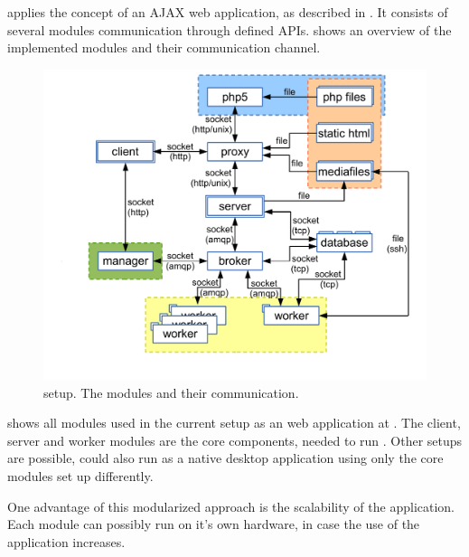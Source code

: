 

\spl applies the concept of an AJAX web application, as described in .
It consists of several modules communication through defined APIs.
 shows an overview of the implemented modules and their communication channel.

\begin{figure}[htbp]
  \centering
    \includegraphics[width=\textwidth]{fig/whole_setup.pdf}
  \caption{\spl setup. The modules and their communication.}
  \label{fig:whole_setup}
\end{figure}


 shows all modules used in the current setup as an web application at \splurl.
The client, server and worker modules are the core components, needed to run \spl.
Other setups are possible, \spl could also run as a native desktop application using only the core modules set up differently.

One advantage of this modularized approach is the scalability of the application.
Each module can possibly run on it's own hardware, in case the use of the application increases.

